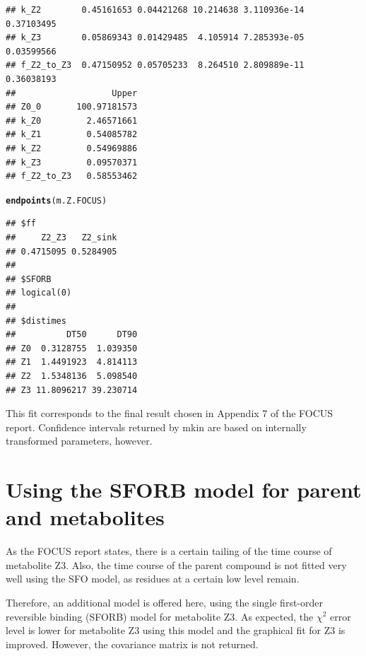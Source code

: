 \documentclass[12pt,a4paper]{article}\usepackage[]{graphicx}\usepackage[]{color}
\makeatletter
\newcommand{\hlstd}[1]{\textcolor[rgb]{0.345,0.345,0.345}{#1}}%
\newcommand{\hlkwd}[1]{\textcolor[rgb]{0.737,0.353,0.396}{\textbf{#1}}}%
\newenvironment{kframe}{%
 \def\at@end@of@kframe{}%
 \ifinner\ifhmode%
  \def\at@end@of@kframe{\end{minipage}}%
  \begin{minipage}{\columnwidth}%
 \fi\fi%
 \def\FrameCommand##1{\hskip\@totalleftmargin \hskip-\fboxsep
 \colorbox{shadecolor}{##1}\hskip-\fboxsep
     \hskip-\linewidth \hskip-\@totalleftmargin \hskip\columnwidth}%
 \MakeFramed {\advance\hsize-\width
   \@totalleftmargin\z@ \linewidth\hsize
   \@setminipage}}%
 {\par\unskip\endMakeFramed%
 \at@end@of@kframe}
\newenvironment{knitrout}{}{} %
\makeatother
\begin{document}
\begin{knitrout}
\begin{kframe}
\begin{verbatim}
## k_Z2        0.45161653 0.04421268 10.214638 3.110936e-14  0.37103495
## k_Z3        0.05869343 0.01429485  4.105914 7.285393e-05  0.03599566
## f_Z2_to_Z3  0.47150952 0.05705233  8.264510 2.809889e-11  0.36038193
##                   Upper
## Z0_0       100.97181573
## k_Z0         2.46571661
## k_Z1         0.54085782
## k_Z2         0.54969886
## k_Z3         0.09570371
## f_Z2_to_Z3   0.58553462
\end{verbatim}
\begin{alltt}
\hlkwd{endpoints}\hlstd{(m.Z.FOCUS)}
\end{alltt}
\begin{verbatim}
## $ff
##     Z2_Z3   Z2_sink 
## 0.4715095 0.5284905 
## 
## $SFORB
## logical(0)
## 
## $distimes
##          DT50      DT90
## Z0  0.3128755  1.039350
## Z1  1.4491923  4.814113
## Z2  1.5348136  5.098540
## Z3 11.8096217 39.230714
\end{verbatim}
\end{kframe}
\end{knitrout}

This fit corresponds to the final result chosen in Appendix 7 of the FOCUS
report. Confidence intervals returned by mkin are based on internally
transformed parameters, however.

\section{Using the SFORB model for parent and metabolites}

As the FOCUS report states, there is a certain tailing of the time course of metabolite 
Z3. Also, the time course of the parent compound is not fitted very well using the 
SFO model, as residues at a certain low level remain.

Therefore, an additional model is offered here, using the single first-order 
reversible binding (SFORB) model for metabolite Z3. As expected, the $\chi^2$
error level is lower for metabolite Z3 using this model and the graphical 
fit for Z3 is improved. However, the covariance matrix is not returned.
\end{document}
